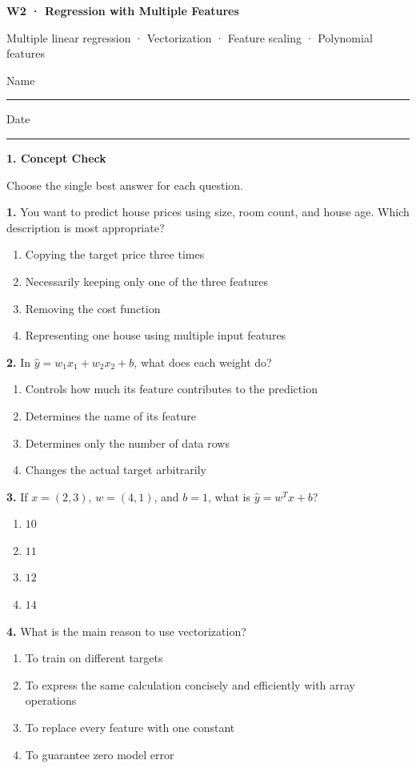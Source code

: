 \documentclass[11pt,a4paper]{article}
\newcommand{\parttitle}[2]{{\large\bfseries\color{ink} #1}\par{\small #2}\par\vspace{5mm}}
\newcommand{\question}[2]{\textbf{#1.} #2\par}
\begin{document}
{\LARGE\bfseries\color{ink} W2 · Regression with Multiple Features}\par
{\small Multiple linear regression · Vectorization · Feature scaling · Polynomial features}\par
\vspace{3mm}Name\enspace\rule{43mm}{0.3pt}\hfill Date\enspace\rule{35mm}{0.3pt}\par\vspace{3mm}
\parttitle{1. Concept Check}{Choose the single best answer for each question.}
\question{1}{You want to predict house prices using size, room count, and house age. Which description is most appropriate?}
\begin{enumerate}[label=(\arabic*),leftmargin=9mm,itemsep=0pt,topsep=2pt,parsep=0pt]
\item Copying the target price three times
\item Necessarily keeping only one of the three features
\item Removing the cost function
\item Representing one house using multiple input features
\end{enumerate}\vfill
\question{2}{In $\hat y=w_1x_1+w_2x_2+b$, what does each weight do?}
\begin{enumerate}[label=(\arabic*),leftmargin=9mm,itemsep=0pt,topsep=2pt,parsep=0pt]
\item Controls how much its feature contributes to the prediction
\item Determines the name of its feature
\item Determines only the number of data rows
\item Changes the actual target arbitrarily
\end{enumerate}\vfill
\question{3}{If $x=(2,3)$, $w=(4,1)$, and $b=1$, what is $\hat y=w^Tx+b$?}
\begin{enumerate}[label=(\arabic*),leftmargin=9mm,itemsep=0pt,topsep=2pt,parsep=0pt]
\item $10$
\item $11$
\item $12$
\item $14$
\end{enumerate}\vfill
\question{4}{What is the main reason to use vectorization?}
\begin{enumerate}[label=(\arabic*),leftmargin=9mm,itemsep=0pt,topsep=2pt,parsep=0pt]
\item To train on different targets
\item To express the same calculation concisely and efficiently with array operations
\item To replace every feature with one constant
\item To guarantee zero model error
\end{enumerate}\vfill
\end{document}

